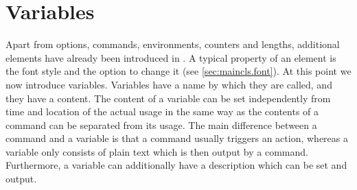 \section{Variables}
\label{sec:scrlttr2.variables}%

Apart from options, commands, environments, counters and lengths,
additional elements have already been introduced in \KOMAScript.  A
typical property of an element is the font style and the option to
change it (see \autoref{sec:maincls.font}). At this point we now
introduce variables. Variables have a name by which they are called,
and they have a content. The content of a variable can be set
independently from time and location of the actual usage in the same
way as the contents of a command can be separated from its usage. The
main difference between a command and a variable is that a command
usually triggers an action, whereas a variable only consists of plain
text which is then output by a command. Furthermore, a variable can
additionally have a description which can be set and output.

